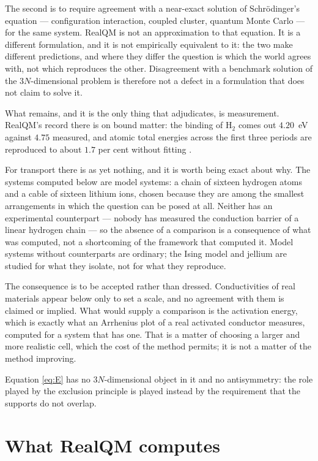 \documentclass[11pt]{article}
\begin{document}
The second is to require agreement with a near-exact solution of Schr\"odinger's equation ---
configuration interaction, coupled cluster, quantum Monte Carlo --- for the same system. RealQM is
not an approximation to that equation. It is a different formulation, and it is not empirically
equivalent to it: the two make different predictions, and where they differ the question is which
the world agrees with, not which reproduces the other. Disagreement with a benchmark solution of the
$3N$-dimensional problem is therefore not a defect in a formulation that does not claim to solve it.

What remains, and it is the only thing that adjudicates, is measurement. RealQM's record there is on
bound matter: the binding of H$_2$ comes out $4.20$~eV against $4.75$ measured, and atomic total
energies across the first three periods are reproduced to about $1.7$ per cent without fitting
\cite{realatoms,realqm}.

For transport there is as yet nothing, and it is worth being exact about why. The systems computed
below are model systems: a chain of sixteen hydrogen atoms and a cable of sixteen lithium ions,
chosen because they are among the smallest arrangements in which the question can be posed at all.
Neither has an experimental counterpart --- nobody has measured the conduction barrier of a linear
hydrogen chain ---
so the absence of a comparison is a consequence of what was computed, not a shortcoming of the
framework that computed it. Model systems without counterparts are ordinary; the Ising model and
jellium are studied for what they isolate, not for what they reproduce.

The consequence is to be accepted rather than dressed. Conductivities of real materials appear below
only to set a scale, and no agreement with them is claimed or implied. What would supply a
comparison is the activation energy, which is exactly what an Arrhenius plot of a real activated
conductor measures, computed for a system that has one. That is a matter of choosing a larger and
more realistic cell, which the cost of the method permits; it is not a matter of the method
improving.

Equation \eqref{eq:E} has no $3N$-dimensional object in it and no antisymmetry: the role played by
the exclusion principle is played instead by the requirement that the supports do not overlap.

\section{What RealQM computes}
\end{document}
